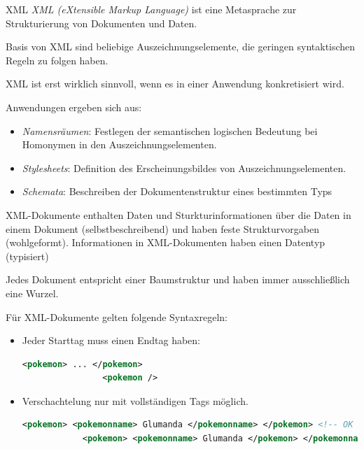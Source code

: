 \begin{defi}{XML}
    \emph{XML (eXtensible Markup Language)} ist eine Metasprache zur Strukturierung von Dokumenten und Daten.
    
    Basis von XML sind beliebige Auszeichnungselemente, die geringen syntaktischen Regeln zu folgen haben.
    
    XML ist erst wirklich sinnvoll, wenn es in einer Anwendung konkretisiert wird.
    
    Anwendungen ergeben sich aus:
    \begin{itemize}
        \item \emph{Namensräumen}:
              Festlegen der semantischen logischen Bedeutung bei Homonymen in den Auszeichnungselementen.
        \item \emph{Stylesheets}:
              Definition des Erscheinungsbildes von Auszeichnungselementen.
        \item \emph{Schemata}:
              Beschreiben der Dokumentenstruktur eines bestimmten Typs
    \end{itemize}
    
    XML-Dokumente enthalten Daten und Sturkturinformationen über die Daten in einem Dokument (selbstbeschreibend) und haben feste Strukturvorgaben (wohlgeformt).
    Informationen in XML-Dokumenten haben einen Datentyp (typisiert)
    
    Jedes Dokument entspricht einer Baumstruktur und haben immer ausschließlich eine Wurzel.
    
    Für XML-Dokumente gelten folgende Syntaxregeln:
    
    \begin{itemize}
        \item Jeder Starttag muss einen Endtag haben:
              
              \begin{lstlisting}[language=XML]
                <pokemon> ... </pokemon>
                <pokemon />
            \end{lstlisting}
        \item Verschachtelung nur mit vollständigen Tags möglich.
              
              \begin{lstlisting}[language=XML]
            <pokemon> <pokemonname> Glumanda </pokemonname> </pokemon> <!-- OK -->
            <pokemon> <pokemonname> Glumanda </pokemon> </pokemonname>  <!-- NOT OK -->
            \end{lstlisting}
    \end{itemize}
\end{defi}

